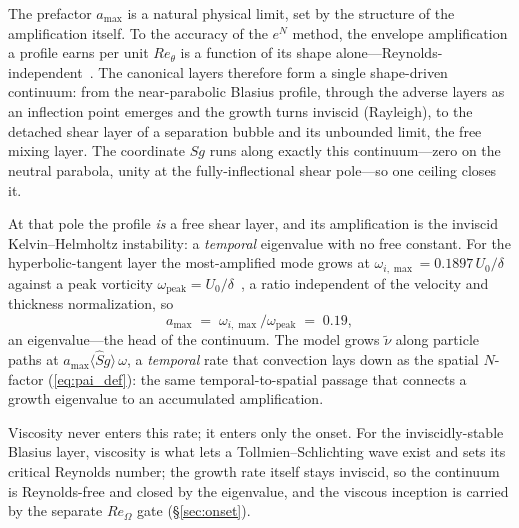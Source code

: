 \documentclass[journal]{new-aiaa}
\begin{document}
The prefactor $a_{\max}$ is a natural physical limit, set by the structure of
the amplification itself. To
the accuracy of the $e^N$ method, the envelope amplification a profile earns per
unit $Re_\theta$ is a function of its shape alone---Reynolds-%
independent~\cite{drela_giles_1987}. The canonical layers therefore form a
single shape-driven continuum: from the near-parabolic Blasius profile, through
the adverse layers as an inflection point emerges and the growth turns inviscid
(Rayleigh), to the detached shear layer of a separation bubble and its unbounded
limit, the free mixing layer. The coordinate $\hat S g$ runs along exactly this
continuum---zero on the neutral parabola, unity at the fully-inflectional shear
pole---so one ceiling closes it.

At that pole the profile \emph{is} a free shear layer, and its amplification is
the inviscid Kelvin--Helmholtz instability: a \emph{temporal} eigenvalue with no
free constant. For the hyperbolic-tangent layer the most-amplified mode grows at
$\omega_{i,\max}=0.1897\,U_0/\delta$ against a peak vorticity
$\omega_{\mathrm{peak}}=U_0/\delta$~\cite{michalke_1964}, a ratio independent of
the velocity and thickness normalization, so
\begin{equation*}
  a_{\max} \;=\; \omega_{i,\max}/\omega_{\mathrm{peak}} \;=\; 0.19 ,
\end{equation*}
an eigenvalue---the head of the continuum. The model grows
$\tilde\nu$ along particle paths at $a_{\max}\langle \hat S g\rangle\,\omega$, a
\emph{temporal} rate that convection lays down as the spatial $N$-factor
(\eqref{eq:pai_def}): the same temporal-to-spatial passage that connects a
growth eigenvalue to an accumulated amplification.

Viscosity never enters this rate; it enters only the onset. For the
inviscidly-stable Blasius layer, viscosity is what lets a Tollmien--Schlichting
wave exist and sets its critical Reynolds number; the growth rate itself stays
inviscid, so the continuum is Reynolds-free and closed by the eigenvalue, and
the viscous inception is carried by the separate $Re_\Omega$ gate
(\S\ref{sec:onset}).
\end{document}
